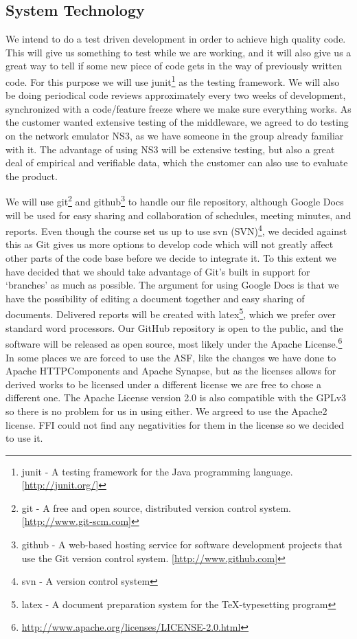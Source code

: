     \subsection{System Technology}\label{System Technology}
    
    We  intend to do a test driven development in order to achieve high quality code. This will give us something to test while we are working, and it will also give us a great way to tell if some new piece of code gets in the way of previously written code. For this purpose we will use \gls{junit}\footnote{\gls{junit} - A testing framework for the Java programming language. [\url{http://junit.org/}]} as the testing framework. We will also be doing periodical code reviews approximately every two weeks of development, synchronized with a code/feature freeze where we make sure everything works. As the customer wanted extensive testing of the middleware, we agreed to do testing on the network emulator NS3, as we have someone in the group already familiar with it. The advantage of using NS3 will be extensive testing, but also a great deal of empirical and verifiable data, which the customer can also use to evaluate the product.

    We will use \gls{git}\footnote{\gls{git} - A free and open source, distributed version control system. [\url{http://www.git-scm.com}]} and \gls{github}\footnote{\gls{github} - A web-based hosting service for software development projects that use the Git version control system. [\url{http://www.github.com}]} to handle our file repository, although Google Docs will be used for easy sharing and collaboration of schedules, meeting minutes, and reports. Even though the course set us up to use \gls{svn} (SVN)\footnote{\gls{svn} - A version control system}, we decided against this as Git gives us more options to develop code which will not greatly affect other parts of the code base before we decide to integrate it. To this extent we have decided that we should take advantage of Git’s built in support for ‘branches’ as much as possible. The argument for using Google Docs is that we have the possibility of editing a document together and easy sharing of documents. Delivered reports will be created with \gls{latex}\footnote{\gls{latex} - A document preparation system for the \TeX -typesetting program}, which we prefer over standard word processors. Our GitHub repository is open to the public, and the software will be released as open source, most likely under the Apache License.\footnote{\url{http://www.apache.org/licenses/LICENSE-2.0.html}} In some places we are forced to use the ASF, like the changes we have done to Apache HTTPComponents and Apache Synapse, but as the licenses allows for derived works to be licensed under a different license we are free to chose a different one. The Apache License version 2.0 is also compatible with the GPLv3 so there is no problem for us in using either. 
    We argreed to use the Apache2 license. FFI could not find any negativities for them in the license so we decided to use it. 

